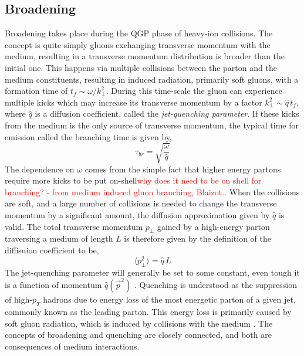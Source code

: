 \documentclass[main.tex]{subfiles}
\begin{document}
\subsection{Broadening}
Broadening takes place during the QGP phase of heavy-ion collisions. The concept is quite simply gluons exchanging transverse momentum with the medium, resulting in a transverse momentum distribution is broader than the initial one. This happens via multiple collisions between the parton and the medium constituents, resulting in induced radiation, primarily soft gluons, with a formation time of \(t_f\sim \omega/k_\perp^2\). During this time-scale the gluon can experience multiple kicks which may increase its transverse momentum by a factor \(k_\perp^2 \sim \hat q \,t_f\), where \(\hat q\) is a diffusion coefficient, called the \emph{jet-quenching parameter}. If these kicks from the medium is the only source of transverse momentum, the typical time for emission called the branching time is given by, 
\begin{equation}\label{eqn: branching_time}
    \tau_{br} = \sqrt{\frac{\omega}{\hat q}}
\end{equation}
The dependence on \(\omega\) comes from the simple fact that higher energy partons require more kicks to be put on-shell\textcolor{red}{why does it need to be on shell for branching? - from medium induced gluon branching, Blaizot.}. 
When the collisions are soft, and a large number of collisions is
needed to change the transverse momentum by a significant amount, the diffusion approximation given by \(\hat q\) is valid. The total transverse momentum \(p_\perp\) gained by a high-energy parton traversing a medium of length \(L\) is therefore given by the definition of the diffisuion coefficient to be, 
\begin{equation}\label{eqn: broadening}
    \langle p_\perp^2\rangle = \hat{q}\, L
\end{equation}
The jet-quenching parameter will generally be set to some constant, even tough it is a function of momentum \(\hat q(\vec p^2)\) \cite{Jet_Structure_HeavyIonCollisions}. Quenching is understood as the suppression of high-\(p_T\) hadrons due to energy loss of the most energetic parton of a given jet, commonly known as the leading parton. This energy loss is primarily caused by soft gluon radiation, which is induced by collisions with the medium \cite{medium_induced_gluon_branching}. The concepts of broadening and quenching are closely connected, and both are consequences of medium interactions.
\end{document}
